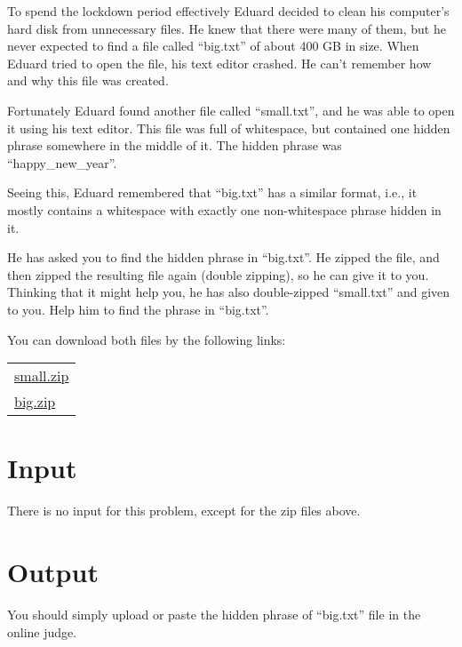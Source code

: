 To spend the lockdown period effectively Eduard decided to clean his computer's hard disk from unnecessary files.
He knew that there were many of them, but he never expected to find a file called ``big.txt'' of about 400 GB in size.
When Eduard tried to open the file, his text editor crashed.
He can't remember how and why this file was created.

Fortunately Eduard found another file called ``small.txt'', and he was able to open it using his text editor.
This file was full of whitespace, but contained one hidden phrase somewhere in the middle of it.
The hidden phrase was ``happy\_new\_year''.

Seeing this, Eduard remembered that ``big.txt'' has a similar format, i.e., it mostly contains a whitespace with exactly one non-whitespace phrase hidden in it.

He has asked you to find the hidden phrase in ``big.txt''.
He zipped the file, and then zipped the resulting file again (double zipping), so he can give it to you.
Thinking that it might help you, he has also double-zipped ``small.txt'' and given to you.
Help him to find the phrase in ``big.txt''.

You can download both files by the following links:
\begin{center}
    \begin{tabular}{l}
        \href{http://167.71.248.201/ejudge/small.zip}{small.zip} \\
        \href{http://167.71.248.201/ejudge/big.zip}{big.zip}
    \end{tabular}
\end{center}

\section*{Input}
There is no input for this problem, except for the zip files above.

\section*{Output}
You should simply upload or paste the hidden phrase of ``big.txt'' file in the online judge.
